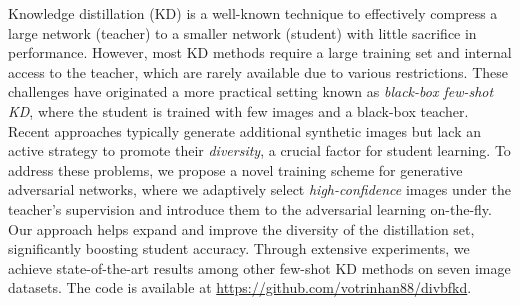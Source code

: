 Knowledge distillation (KD) is a well-known technique to effectively compress a large network (teacher) to a smaller network (student) with little sacrifice in performance.
However, most KD methods require a large training set and internal access to the teacher, which are rarely available due to various restrictions.
These challenges have originated a more practical setting known as \textit{black-box few-shot KD}, where the student is trained with few images and a black-box teacher.
Recent approaches typically generate additional synthetic images but lack an active strategy to promote their \textit{diversity}, a crucial factor for student learning.
To address these problems, we propose a novel training scheme for generative adversarial networks, where we adaptively select \textit{high-confidence} images under the teacher's supervision and introduce them to the adversarial learning on-the-fly.
Our approach helps expand and improve the diversity of the distillation set, significantly boosting student accuracy.
Through extensive experiments, we achieve state-of-the-art results among other few-shot KD methods on seven image datasets.
The code is available at \url{https://github.com/votrinhan88/divbfkd}.
